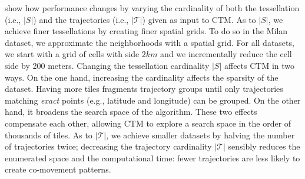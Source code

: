 \documentclass[
]{ceurart}
\renewcommand{\sf}[1]{\textsf{\textup{#1}}}
\begin{document}
 show how performance changes by varying the cardinality of both the tessellation (i.e., $|S|$) and the trajectories (i.e., $|\mathcal{T}|$) given as input to CTM.
As to $|S|$, we achieve finer tessellations by creating finer spatial grids. To do so in the \sf{Milan} dataset, we approximate the neighborhoods with a spatial grid.
For all datasets, we start with a grid of cells with side $2km$ and we incrementally reduce the cell side by 200 meters.
Changing the tessellation cardinality $|S|$ affects CTM in two ways.
On the one hand, increasing the cardinality affects the sparsity of the dataset.
Having more tiles fragments trajectory groups until only trajectories matching \textit{exact} points (e.g., latitude and longitude) can be grouped.
On the other hand, it broadens the search space of the algorithm.
These two effects compensate each other, allowing CTM to explore a search space in the order of thousands of tiles.
As to $|\mathcal{T}|$, we achieve smaller datasets by halving the number of trajectories twice;
decreasing the trajectory cardinality $|\mathcal{T}|$ sensibly reduces the enumerated space and the computational time:
fewer trajectories are less likely to create 
co-movement patterns. %
\end{document}
